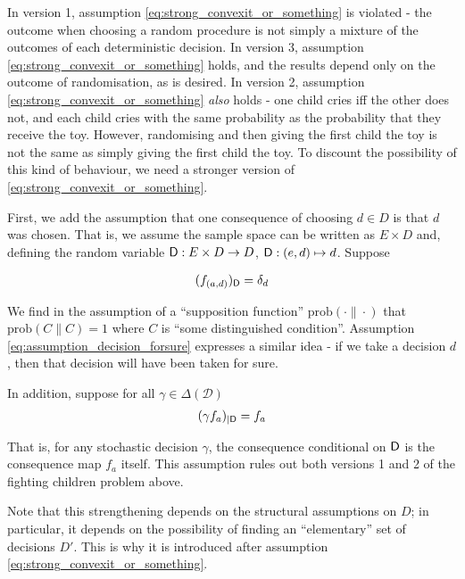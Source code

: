 In version 1, assumption \ref{eq:strong_convexit_or_something} is violated - the outcome when choosing a random procedure is not simply a mixture of the outcomes of each deterministic decision. In version 3, assumption \ref{eq:strong_convexit_or_something} holds, and the results depend only on the outcome of randomisation, as is desired. In version 2, assumption \ref{eq:strong_convexit_or_something} \emph{also} holds - one child cries iff the other does not, and each child cries with the same probability as the probability that they receive the toy. However, randomising and then giving the first child the toy is not the same as simply giving the first child the toy. To discount the possibility of this kind of behaviour, we need a stronger version of \ref{eq:strong_convexit_or_something}. 

First, we add the assumption that one consequence of choosing $d\in D$ is that $d$ was chosen. That is, we assume the sample space can be written as $E\times D$ and, defining the random variable $\mathsf{D}:E\times D\to D$, $\mathsf{D}:(e,d)\mapsto d$. Suppose

\begin{align}
	(f_{(a,d)})_{\mathsf{D}} = \delta_d \label{eq:assumption_decision_forsure}
\end{align}

We find in \cite{joyce_why_2000} the assumption of a ``supposition function'' $\mathrm{prob}(\cdot\|\cdot)$ that $\mathrm{prob}(C\|C)=1$ where $C$ is ``some distinguished condition''. Assumption \ref{eq:assumption_decision_forsure} expresses a similar idea - if we take a decision $d$, then that decision will have been taken for sure.

In addition, suppose for all $\gamma\in \Delta(\mathcal{D})$
\begin{align}
	(\gamma f_{a})_{|\mathsf{D}} = f_a \label{eq:consequence_is_conditional}
\end{align}

That is, for any stochastic decision $\gamma$, the consequence conditional on $\mathsf{D}$ is the consequence map $f_a$ itself. This assumption rules out both versions 1 and 2 of the fighting children problem above.


Note that this strengthening depends on the structural assumptions on $D$; in particular, it depends on the possibility of finding an ``elementary'' set of decisions $D'$. This is why it is introduced after assumption \ref{eq:strong_convexit_or_something}.





